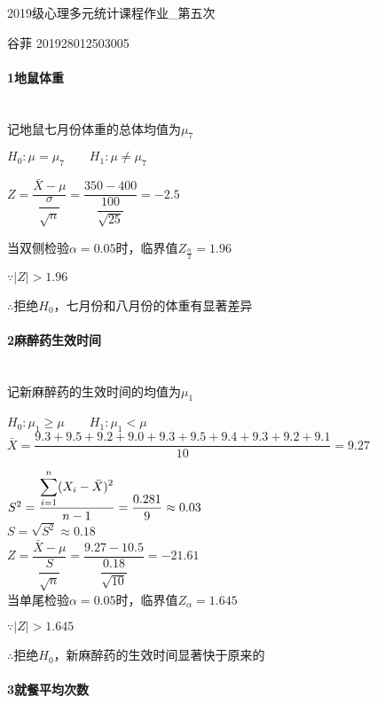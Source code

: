 \documentclass[UTF8]{ctexart}
\begin{document}
\begin{center}
	\LARGE
	2019级心理多元统计课程作业\_第五次

	\normalsize
	谷菲 201928012503005
\end{center}

\paragraph{1地鼠体重}
~\\

记地鼠七月份体重的总体均值为$\mu_7$

$H_0:\mu=\mu_7 \qquad H_1:\mu\ne\mu_7$

$Z=\dfrac{\bar{X}-\mu}{\dfrac{\sigma}{\sqrt{n}}}=\dfrac{350-400}{\dfrac{100}{\sqrt{25}}}=-2.5$

当双侧检验$\alpha=0.05$时，临界值$Z_{\frac{\alpha}{2}}=1.96$

$\because |Z| > 1.96$

$\therefore$拒绝$H_0$，七月份和八月份的体重有显著差异

\paragraph{2麻醉药生效时间}
~\\

记新麻醉药的生效时间的均值为$\mu_1$

$H_0:\mu_1\ge\mu \qquad H_1:\mu_1<\mu$
~\\

$\bar{X}=\dfrac{9.3+9.5+9.2+9.0+9.3+9.5+9.4+9.3+9.2+9.1}{10}=9.27$

$S^2=\dfrac{\displaystyle \sum_{i=1}^n (X_i-\Bar{X})^2}{n-1}=\dfrac{0.281}{9}\approx0.03$
~\\

$S=\sqrt{S^2}\approx0.18$
~\\

$Z=\dfrac{\bar{X}-\mu}{\dfrac{S}{\sqrt{n}}}=\dfrac{9.27-10.5}{\dfrac{0.18}{\sqrt{10}}}=-21.61$
~\\
	
当单尾检验$\alpha=0.05$时，临界值$Z_{\alpha}=1.645$

$\because |Z| > 1.645$
	
$\therefore$拒绝$H_0$，新麻醉药的生效时间显著快于原来的

\paragraph{3就餐平均次数}
~\\
\end{document}
